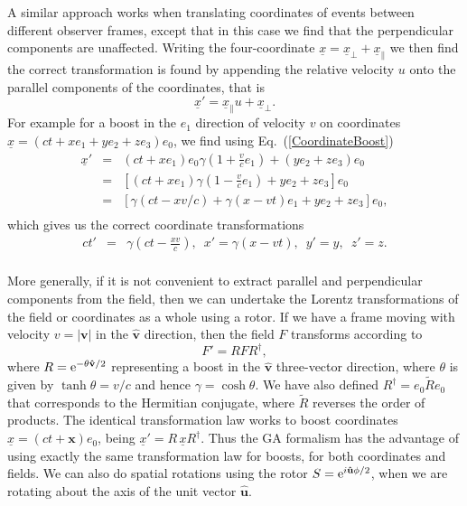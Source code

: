 \documentclass[12pt,aps,prb,preprint]{revtex4}   %
\newcommand{\be}{\begin{equation}}
\newcommand{\ee}{\end{equation}}
\newcommand{\bea}{\begin{eqnarray}}
\newcommand{\eea}{\end{eqnarray}}
\newcommand{\rme}{{\rm{e}}}
\begin{document}
A similar approach works when translating coordinates of events between different observer frames, except that in this case we find that the perpendicular components are unaffected. Writing the four-coordinate $ \underline{x} = \underline{x}_{\perp}+ \underline{x}_{\| } $ we then find the correct transformation is found by appending the relative velocity $ u $ onto the parallel components of the coordinates, that is
\be \label{CoordinateBoost}
\underline{x}' = \underline{x}_{\|} u + \underline{x}_{\perp}.
\ee
For example for a boost in the $ e_1 $ direction of velocity $ v $ on coordinates $ \underline{x} = (ct + x e_1 + y e_2 + z e_3) e_0 $, we find using Eq.~(\ref{CoordinateBoost})
\bea
\underline{x}' & = & \left (ct + x e_1 \right ) e_0 \gamma \left (1+ \frac{v}{c} e_1 \right ) + \left (y e_2 + z e_3 \right ) e_0 \\ \nonumber
 & = & \left [ \left (ct + x e_1 \right ) \gamma \left (1 -  \frac{v}{c} e_1 \right ) + y e_2 + z e_3 \right  ] e_0 \\ \nonumber
 & = & \left [ \gamma \left (ct - x v/c \right ) + \gamma \left ( x  - vt \right ) e_1 + y e_2 + z e_3 \right ] e_0 , \\ \nonumber
\eea
which gives us the correct coordinate transformations
\bea
c t' & = & \gamma \left (c t - \frac{x v}{c} \right ), \,\,\, x' =  \gamma \left (x - v t \right ) , \,\,\, y' = y , \,\,\, z' = z . \\ \nonumber
\eea

More generally, if it is not convenient to extract parallel and perpendicular components from the field, then we can undertake the Lorentz transformations of the field or coordinates as a whole using a rotor. If we have a frame moving with velocity $ v = |\textbf{v}| $ in the $ \mathbf{\hat{v}} $ direction, then the field $ F $ transforms according to
\be
F' = R F R^{\dagger},
\ee
where $ R  = \rme^{- \theta \mathbf{\hat{v}} /2} $ representing a boost in the $ \mathbf{\hat{v}} $ three-vector direction, where $ \theta $ is given by $ \tanh \theta =  v/c $ and hence $ \gamma = \cosh \theta $. We have also defined $ R^{\dagger} = e_0 \tilde{R} e_0 $ that corresponds to the Hermitian conjugate, where $ \tilde{R} $ reverses the order of products.  The identical transformation law works to boost coordinates $ \underline{x} = (c t + \textbf{x}) e_0 $, being $ \underline{x}' = R \, \underline{x} R^{\dagger} $.  Thus the GA formalism has the advantage of using exactly the same transformation law for boosts, for both coordinates and fields.
We can also do spatial rotations using the rotor $ S = \rme^{i \mathbf{\hat{u}} \phi/2} $, when we are rotating about the axis of the unit vector $ \mathbf{\hat{u}} $.
\end{document}
